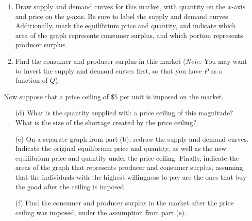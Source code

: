 \documentclass[11pt]{article}
\begin{document}
\begin{enumerate}
\begin{enumerate}
    \item Draw supply and demand curves for this market, with quantity on the $x$-axis and price on the $y$-axis. Be sure to label the supply and demand curves. Additionally, mark the equilibrium price and quantity, and indicate which area of the graph represents consumer surplus, and which portion represents producer surplus.

    \item Find the consumer and producer surplus in this market (\emph{Note:} You may want to invert the supply and demand curves first, so that you have $P$ as a function of $Q$).
  \end{enumerate}

  Now suppose that a price ceiling of \$5 per unit is imposed on the market. 

  \begin{enumerate}
    \item[(d)] What is the quantity supplied with a price ceiling of this magnitude? What is the size of the shortage created by the price ceiling?

    \item[(e)] On a separate graph from part (b), redraw the supply and demand curves. Indicate the original equilibrium price and quantity, as well as the new equilibrium price and quantity under the price ceiling. Finally, indicate the areas of the graph that represents producer and consumer surplus, assuming that the individuals with the highest willingness to pay are the ones that buy the good after the ceiling is imposed.

    \item[(f)] Find the consumer and producer surplus in the market after the price ceiling was imposed, under the assumption from part (e).
  \end{enumerate}
\end{enumerate}
\end{document}
